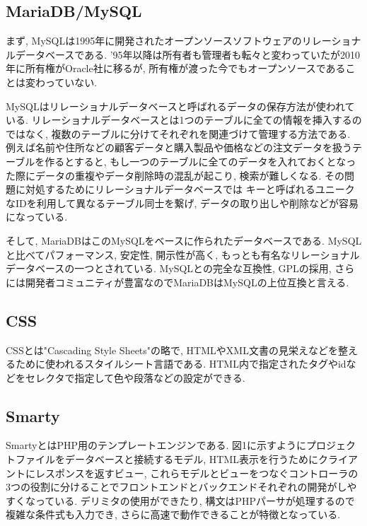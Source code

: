 \documentclass[submit,techrep]{ipsj}
\begin{document}
\subsection{MariaDB/MySQL}
まず, MySQLは1995年に開発されたオープンソースソフトウェアのリレーショナルデータベースである. 
'95年以降は所有者も管理者も転々と変わっていたが2010年に所有権がOracle社に移るが, 所有権が渡った今でもオープンソースであることは変わっていない.

MySQLはリレーショナルデータベースと呼ばれるデータの保存方法が使われている. リレーショナルデータベースとは1つのテーブルに全ての情報を挿入するのではなく, 複数のテーブルに分けてそれぞれを関連づけて管理する方法である. 
例えば名前や住所などの顧客データと購入製品や価格などの注文データを扱うテーブルを作るとすると, もし一つのテーブルに全てのデータを入れておくとなった際にデータの重複やデータ削除時の混乱が起こり, 検索が難しくなる. その問題に対処するためにリレーショナルデータベースでは
キーと呼ばれるユニークなIDを利用して異なるテーブル同士を繋げ, データの取り出しや削除などが容易になっている. 

そして, MariaDBはこのMySQLをベースに作られたデータベースである. MySQLと比べてパフォーマンス, 安定性, 開示性が高く, もっとも有名なリレーショナルデータベースの一つとされている. MySQLとの完全な互換性, GPLの採用, さらには開発者コミュニティが豊富なのでMariaDBはMySQLの上位互換と言える. 
\subsection{CSS}
CSSとは"Cascading Style Sheets"の略で, HTMLやXML文書の見栄えなどを整えるために使われるスタイルシート言語である. 
HTML内で指定されたタグやidなどをセレクタで指定して色や段落などの設定ができる. 

\subsection{Smarty}
SmartyとはPHP用のテンプレートエンジンである. 図1に示すようにプロジェクトファイルをデータベースと接続するモデル, HTML表示を行うためにクライアントにレスポンスを返すビュー, これらモデルとビューをつなぐコントローラの3つの役割に分けることでフロントエンドとバックエンドそれぞれの開発がしやすくなっている. デリミタの使用ができたり, 構文はPHPパーサが処理するので複雑な条件式も入力でき, さらに高速で動作できることが特徴となっている.
\end{document}
